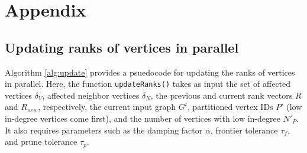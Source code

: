 \section{Appendix}



\ignore{}
\ignore{}


\subsection{Updating ranks of vertices in parallel}
\label{sec:update}

Algorithm \ref{alg:update} provides a psuedocode for updating the ranks of vertices in parallel. Here, the function \texttt{updateRanks()} takes as input the set of affected vertices $\delta_V$, affected neighbor vertices $\delta_N$, the previous and current rank vectors $R$ and $R_{new}$, respectively, the current input graph $G^t$, partitioned vertex IDs $P'$ (low in-degree vertices come first), and the number of vertices with low in-degree $N'_P$. It also requires parameters such as the damping factor $\alpha$, frontier tolerance $\tau_f$, and prune tolerance $\tau_p$.

